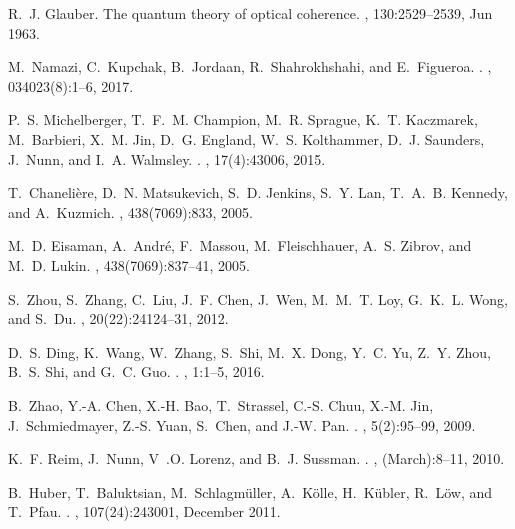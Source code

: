 \documentclass[%
 reprint,
 amsmath,amssymb,
 aps,
 pra,
]{revtex4-1}
\begin{document}
\begin{thebibliography}{10}
R.~J. Glauber.
\newblock The quantum theory of optical coherence.
, 130:2529--2539, Jun 1963.

M.~Namazi, C.~Kupchak, B.~Jordaan, R.~Shahrokhshahi, and E.~Figueroa.
.
, 034023(8):1--6, 2017.

P.~S. Michelberger, T.~F.~M. Champion, M.~R. Sprague, K.~T. Kaczmarek,
  M.~Barbieri, X.~M. Jin, D.~G. England, W.~S. Kolthammer, D.~J. Saunders,
  J.~Nunn, and I.~A. Walmsley.
.
, 17(4):43006, 2015.

T.~Chaneli{\`{e}}re, D.~N. Matsukevich, S.~D. Jenkins, S.~Y. Lan, T.~A.~B.
  Kennedy, and A.~Kuzmich.
, 438(7069):833, 2005.

M.~D. Eisaman, A.~Andr{\'{e}}, F.~Massou, M.~Fleischhauer, A.~S. Zibrov, and
  M.~D. Lukin.
, 438(7069):837--41, 2005.

S.~Zhou, S.~Zhang, C.~Liu, J.~F. Chen, J.~Wen, M.~M.~T. Loy, G.~K.~L. Wong, and
  S.~Du.
, 20(22):24124--31, 2012.

D.~S. Ding, K.~Wang, W.~Zhang, S.~Shi, M.~X. Dong, Y.~C. Yu, Z.~Y. Zhou, B.~S.
  Shi, and G.~C. Guo.
.
, 1:1--5, 2016.

B.~Zhao, Y.-A. Chen, X.-H. Bao, T.~Strassel, C.-S. Chuu, X.-M. Jin,
  J.~Schmiedmayer, Z.-S. Yuan, S.~Chen, and J.-W. Pan.
.
, 5(2):95--99, 2009.

K.~F. Reim, J.~Nunn, V~.O. Lorenz, and B.~J. Sussman.
.
, (March):8--11, 2010.

B.~Huber, T.~Baluktsian, M.~Schlagm\"{u}ller, A.~K\"{o}lle, H.~K\"{u}bler,
  R.~L\"{o}w, and T.~Pfau.
.
, 107(24):243001, December 2011.


\end{thebibliography}
\end{document}
